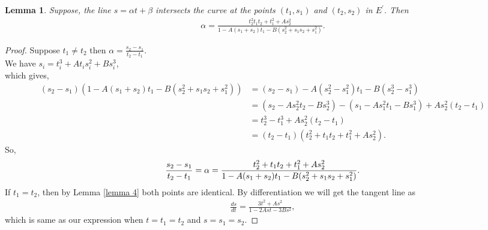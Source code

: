 \documentclass[12pt,leqno]{amsart}
\newcommand{\<}{\langle}
\renewcommand{\>}{\rangle}
\newtheorem{lemma}{Lemma}
\theoremstyle{definition}
\numberwithin{equation}{section}
\begin{document}
\begin{lemma}\label{lemma11}
    Suppose, the line $s=\alpha t+\beta$ intersects the curve at the points $(t_1,s_1)$ and $(t_2,s_2)$ in $E^{'}$. Then
\begin{align*}
    \alpha=\frac{t_2^{2}t_1 t_2+t_1^{2}+As_2^{2}}{1-A(s_1+s_2)t_1-B(s_2^{2}+s_1 s_2+s_1^{2})}.
\end{align*}
\end{lemma}
\begin{proof}
    Suppose $t_1\neq t_2$ then $\alpha=\frac{s_2-s_1}{t_2-t_1}$.\\
    We have $s_i=t_i^3+At_is_i^2+Bs_i^3$,\\
    which gives,
    \begin{align*}
        (s_2-s_1)(1-A(s_1+s_2)t_1-B(s_2^2+s_1s_2+s_1^2))&=(s_2-s_1)-A(s_2^2-s_1^2)t_1-B(s_2^3-s_1^3)\\
        &=(s_2-As_2^2t_2-Bs_2^3)-(s_1-As_1^2t_1-Bs_1^3)+As_2^2(t_2-t_1)\\
        &=t_2^3-t_1^3+As_2^2(t_2-t_1)\\
        &=(t_2-t_1)(t_2^2+t_1 t_2+t_1^2+As_2^2).
    \end{align*}
    So,
    \begin{equation}\label{beta}
        \frac{s_2-s_1}{t_2-t_1}=\alpha=\frac{t_2^2+t_1 t_2+t_1^2+As_2^2}{1-A(s_1+s_2)t_1-B(s_2^2+s_1s_2+s_1^2)}.\\
   \end{equation}
    If $t_1=t_2$, then by Lemma \ref{lemma 4} both points are identical. By differentiation we will get the tangent line as
    \begin{align*}
        \frac{ds}{dt}=\frac{3t^2+As^2}{1-2Ast-3Bs^2},
    \end{align*}
    which is same as our expression when $t=t_1=t_2$ and $s=s_1=s_2$.
\end{proof}
\end{document}
